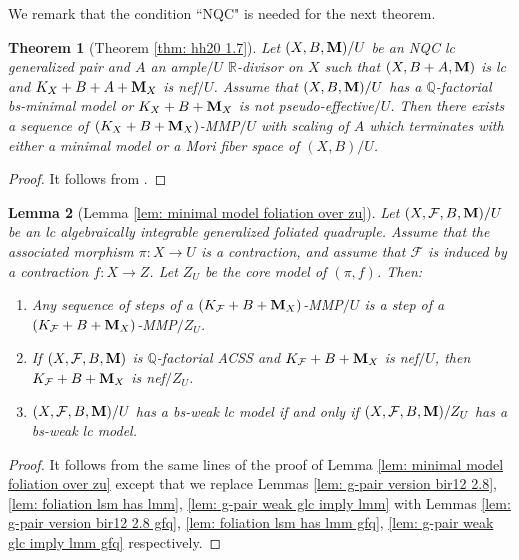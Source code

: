 \documentclass[11pt]{amsart}
\numberwithin{equation}{section}
\newcommand{\Mm}{{\bf{M}}}
\newcommand{\Qq}{\mathbb{Q}}
\newcommand{\Rr}{\mathbb{R}}
\newcommand{\Ff}{\mathcal{F}}
\newtheorem{thm}{Theorem}[section]
\newtheorem{lem}[thm]{Lemma}
\theoremstyle{definition}
\theoremstyle{definition}
\theoremstyle{definition}
\begin{document}
We remark that the condition ``NQC" is needed for the next theorem.

\begin{thm}[Theorem \ref{thm: hh20 1.7}]\label{thm: hh20 1.7 gfq}
    Let $(X,B,\Mm)/U$ be an NQC lc generalized pair and $A$ an ample$/U$ $\Rr$-divisor on $X$ such that $(X,B+A,\Mm)$ is lc and $K_X+B+A+\Mm_X$ is nef$/U$. Assume that $(X,B,\Mm)/U$ has a $\Qq$-factorial bs-minimal model or $K_X+B+\Mm_X$ is not pseudo-effective$/U$. Then there exists a sequence of $(K_X+B+\Mm_X)$-MMP$/U$ with scaling of $A$ which terminates with either a minimal model or a Mori fiber space of $(X,B)/U$. 
\end{thm}
\begin{proof}
It follows from \cite[Theorem A]{TX23}.
\end{proof}



\begin{lem}[Lemma \ref{lem: minimal model foliation over zu}]\label{lem: minimal model foliation over zu gfq}
    Let $(X,\Ff,B,\Mm)/U$ be an lc algebraically integrable generalized foliated quadruple. Assume that the associated morphism $\pi: X\rightarrow U$ is a contraction, and assume that $\Ff$ is induced by a contraction $f: X\rightarrow Z$. Let $Z_U$ be the core model of $(\pi,f)$. Then:
    \begin{enumerate}
        \item Any sequence of steps of a $(K_{\Ff}+B+\Mm_X)$-MMP$/U$ is a step of a $(K_{\Ff}+B+\Mm_X)$-MMP$/Z_U$.
        \item If $(X,\Ff,B,\Mm)$ is $\Qq$-factorial ACSS and $K_{\Ff}+B+\Mm_X$ is nef$/U$, then $K_{\Ff}+B+\Mm_X$ is nef$/Z_U$.
        \item $(X,\Ff,B,\Mm)/U$ has a bs-weak lc model if and only if $(X,\Ff,B,\Mm)/Z_U$ has a bs-weak lc model.
    \end{enumerate}
\end{lem}
\begin{proof}
    It follows from the same lines of the proof of Lemma \ref{lem: minimal model foliation over zu} except that we replace Lemmas \ref{lem: g-pair version bir12 2.8}, \ref{lem: foliation lsm has lmm}, \ref{lem: g-pair weak glc imply lmm} with Lemmas \ref{lem: g-pair version bir12 2.8 gfq}, \ref{lem: foliation lsm has lmm gfq}, \ref{lem: g-pair weak glc imply lmm gfq} respectively.
\end{proof}
\end{document}
